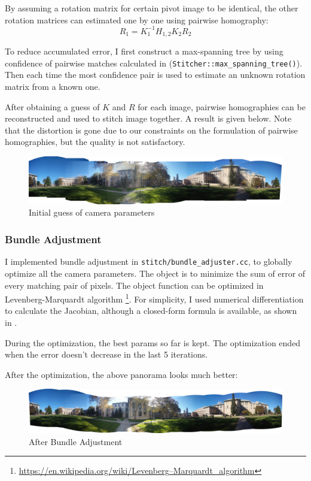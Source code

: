 By assuming a rotation matrix for certain pivot image to be identical,
the other rotation matrices
can estimated one by one using pairwise homography:
\[ R_1 = K_1^{-1}H_{1,2}K_2R_2\]

To reduce accumulated error,
I first construct a max-spanning tree by using
confidence of pairwise matches calculated in  (\verb|Stitcher::max_spanning_tree()|).
Then each time the most confidence pair is used to estimate
an unknown rotation matrix from a known one.

After obtaining a guess of $K$ and $R$ for each image,
pairwise homographies can be reconstructed and used to
stitch image together. A result is given below. Note that
the distortion is gone due to our constraints on the formulation
of pairwise homographies, but the quality is not satisfactory.
\begin{figure}[H]
  \centering
  \includegraphics[width=\textwidth]{res/initial_camera.jpg}
  \caption{Initial guess of camera parameters}
\end{figure}

\subsubsection{Bundle Adjustment}

I implemented bundle adjustment in \verb|stitch/bundle_adjuster.cc|,
to globally optimize all the camera parameters.
The object is to minimize the sum of error of every matching pair of pixels.
The object function can be optimized in Levenberg-Marquardt algorithm
\footnote{\url{https://en.wikipedia.org/wiki/Levenberg–Marquardt_algorithm}}.
For simplicity, I used numerical differentiation to calculate
the Jacobian, although a closed-form formula is available,
as shown in \cite{panoramic-sift}.

During the optimization, the best params so far is kept.
The optimization ended when the error doesn't decrease
in the last 5 iterations.

After the optimization, the above panorama looks much better:
\begin{figure}[H]
  \centering
  \includegraphics[width=\textwidth]{res/after-ba.jpg}
  \caption{After Bundle Adjustment}
\end{figure}

